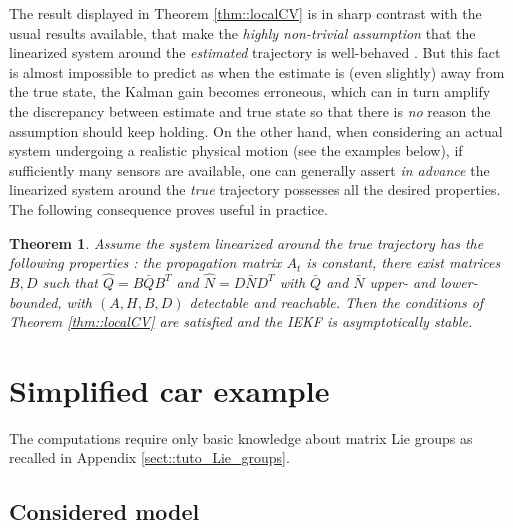 \documentclass[a4paper,12pt,onecolumn]{article}
\newtheorem{thm}{Theorem}
\begin{document}
The result displayed in Theorem \ref{thm::localCV} is in sharp contrast with the usual results available, that make the \emph{highly non-trivial  assumption} that the linearized system around the \emph{estimated} trajectory is well-behaved \cite{boutayeb,song-grizzle-95,reif,bonnabel2012contraction}. But this fact is almost impossible to predict as when the estimate is (even slightly) away  from the true state, the Kalman gain becomes erroneous, which can in turn amplify the discrepancy between estimate and true state so that there is \emph{no} reason the assumption should keep holding. On the other hand, when considering an actual system undergoing a realistic physical motion (see the examples below), if sufficiently many sensors are available, one can generally assert \emph{in advance} the linearized system around the \emph{true} trajectory  possesses all the desired properties. The following consequence  proves useful in practice.
\begin{thm}
\label{thm::bounded}
Assume the system linearized around the \emph{true} trajectory has the following properties : the propagation matrix $A_t$ is constant, there exist matrices $B,D$ such that $\hat{Q}=B \bar{Q} B^T$ and $\hat{N} = D \bar{N} D^T$ with $\bar{Q}$ and $\bar{N}$ upper- and lower-bounded, with $(A,H,B,D)$ detectable and reachable. Then the conditions of Theorem \ref{thm::localCV} are satisfied and the IEKF is asymptotically stable.
\end{thm}





\section{Simplified car example}\label{sect::examples:A}
The computations require only  basic knowledge about matrix Lie groups as recalled in Appendix \ref{sect::tuto_Lie_groups}.


\subsection{Considered model}
\end{document}
